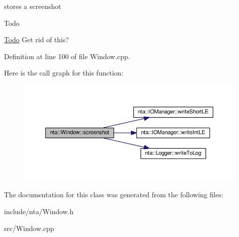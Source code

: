 stores a screenshot 

\begin{DoxyRefDesc}{Todo}
\item[\hyperlink{todo__todo000018}{Todo}]Get rid of this? \end{DoxyRefDesc}


Definition at line 100 of file Window.\+cpp.

Here is the call graph for this function\+:\nopagebreak
\begin{figure}[H]
\begin{center}
\leavevmode
\includegraphics[width=350pt]{d4/dfb/classnta_1_1Window_aa144f6bb014aaad3c91c3f3e6ad56f9c_cgraph}
\end{center}
\end{figure}


The documentation for this class was generated from the following files\+:\begin{DoxyCompactItemize}
\item 
include/nta/Window.\+h\item 
src/Window.\+cpp\end{DoxyCompactItemize}
